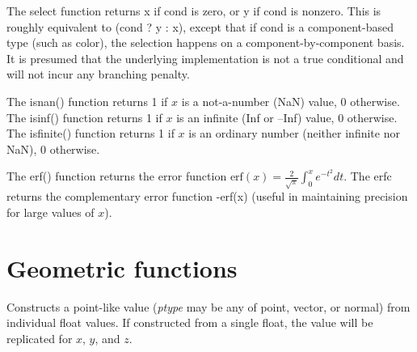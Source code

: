 \documentclass[11pt,letterpaper]{book}
\def\float{{\cf float}\xspace}
\def\normal{{\cf normal}\xspace}
\def\point{{\cf point}\xspace}
\def\vector{{\cf vector}\xspace}
\begin{document}
\NEW  %
The {\cf select} function returns {\cf x} if {\cf cond} is zero, or {\cf y}
if {\cf cond} is nonzero. This is roughly equivalent to {\cf (cond ? y : x)},
except that if {\cf cond} is a component-based type (such as {\cf color}),
the selection happens on a component-by-component basis. It is presumed
that the underlying implementation is not a true conditional and will not
incur any branching penalty.
\apiend

  
The {\cf isnan()} function returns 1 if $x$ is a not-a-number (NaN)
value, 0 otherwise.  The {\cf isinf()} function returns 1 if $x$ is an
infinite (Inf or --Inf) value, 0 otherwise.  The {\cf isfinite()}
function returns 1 if $x$ is an ordinary number (neither infinite nor
NaN), 0 otherwise.  \apiend

 
The {\cf erf()} function returns the error function 
${\mathrm{erf}(x) = \frac{2}{\sqrt{\pi}} \int_0^x e^{-t^2}} dt$.
The {\cf erfc} returns the complementary error function {-erf(x)}
(useful in maintaining precision for large values of $x$).
\apiend

\section{Geometric functions}
\label{sec:stdlib:geom}


Constructs a point-like value (\emph{ptype} may be any of \point,
\vector, or \normal) from individual \float values.  If constructed
from a single \float, the value will be replicated for $x$, $y$, and $z$.
\end{document}
